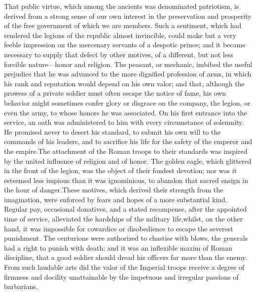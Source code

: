 
That public virtue, which among the ancients was denominated
patriotism, is derived from a strong sense of our own interest in
the preservation and prosperity of the free government of which
we are members. Such a sentiment, which had rendered the legions
of the republic almost invincible, could make but a very feeble
impression on the mercenary servants of a despotic prince; and it
became necessary to supply that defect by other motives, of a
different, but not less forcible nature—honor and religion. The
peasant, or mechanic, imbibed the useful prejudice that he was
advanced to the more dignified profession of arms, in which his
rank and reputation would depend on his own valor; and that,
although the prowess of a private soldier must often escape the
notice of fame, his own behavior might sometimes confer glory or
disgrace on the company, the legion, or even the army, to whose
honors he was associated. On his first entrance into the service,
an oath was administered to him with every circumstance of
solemnity. He promised never to desert his standard, to submit
his own will to the commands of his leaders, and to sacrifice his
life for the safety of the emperor and the empire.\footnotemark[33] The
attachment of the Roman troops to their standards was inspired by
the united influence of religion and of honor. The golden eagle,
which glittered in the front of the legion, was the object of
their fondest devotion; nor was it esteemed less impious than it
was ignominious, to abandon that sacred ensign in the hour of
danger.\footnotemark[34] These motives, which derived their strength from the
imagination, were enforced by fears and hopes of a more
substantial kind. Regular pay, occasional donatives, and a stated
recompense, after the appointed time of service, alleviated the
hardships of the military life,\footnotemark[35] whilst, on the other hand, it
was impossible for cowardice or disobedience to escape the
severest punishment. The centurions were authorized to chastise
with blows, the generals had a right to punish with death; and it
was an inflexible maxim of Roman discipline, that a good soldier
should dread his officers far more than the enemy. From such
laudable arts did the valor of the Imperial troops receive a
degree of firmness and docility unattainable by the impetuous and
irregular passions of barbarians.


